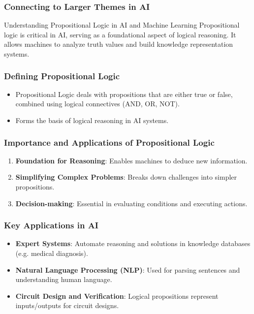 \documentclass[aspectratio=169]{beamer}
\begin{document}
\begin{frame}[fragile]
    \frametitle{Connecting to Larger Themes in AI}
    \begin{block}{Understanding Propositional Logic in AI and Machine Learning}
        Propositional logic is critical in AI, serving as a foundational aspect of logical reasoning. It allows machines to analyze truth values and build knowledge representation systems.
    \end{block}
\end{frame}

\begin{frame}[fragile]
    \frametitle{Defining Propositional Logic}
    \begin{itemize}
        \item Propositional Logic deals with propositions that are either true or false, combined using logical connectives (AND, OR, NOT).
        \item Forms the basis of logical reasoning in AI systems.
    \end{itemize}
\end{frame}

\begin{frame}[fragile]
    \frametitle{Importance and Applications of Propositional Logic}
    \begin{enumerate}
        \item \textbf{Foundation for Reasoning}: Enables machines to deduce new information.
        \item \textbf{Simplifying Complex Problems}: Breaks down challenges into simpler propositions.
        \item \textbf{Decision-making}: Essential in evaluating conditions and executing actions.
    \end{enumerate}
\end{frame}

\begin{frame}[fragile]
    \frametitle{Key Applications in AI}
    \begin{itemize}
        \item \textbf{Expert Systems}: Automate reasoning and solutions in knowledge databases (e.g. medical diagnosis).
        \item \textbf{Natural Language Processing (NLP)}: Used for parsing sentences and understanding human language.
        \item \textbf{Circuit Design and Verification}: Logical propositions represent inputs/outputs for circuit designs.
    \end{itemize}
\end{frame}
\end{document}
